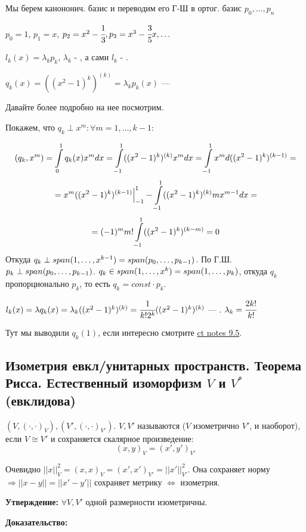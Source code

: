 Мы берем канононич. базис и переводим его Г-Ш в ортог. базис $p_0,\ldots, p_n$

$p_0 = 1$, $p_1 = x$, $p_2 = x^2-\cfrac{1}{3}, p_3 = {x^3}-{\cfrac{3}{5}x}, \ldots$

$l_k(x) = \lambda_k p_k$, $\lambda_k$ - , а сами $l_k$ - .

$q_k(x) = ((x^2-1)^k)^{(k)} = \lambda_k p_k(x)$ --- 

Давайте более подробно на нее посмотрим. 

Покажем, что $q_k \perp x^m: \forall m = 1,\ldots, k-1$:

$$(q_k, x^m) = \displaystyle\int\limits_{0}^{1}q_k(x) x^m dx = \displaystyle\int\limits_{-1}^{1}((x^2-1)^k)^{(k)}x^m dx = \displaystyle\int\limits_{-1}^{1}x^m d ((x^2-1)^k)^{(k-1)} = $$
$$= x^m ((x^2-1)^k)^{(k-1)}\Big|_{-1}^1 - \displaystyle\int\limits_{-1}^{1}((x^2-1)^k)^{(k)}m x^{m-1}dx = $$
$$ = (-1)^m m! \displaystyle\int\limits_{-1}^{1}((x^2-1)^k)^{(k-m)} =0$$
Откуда $q_k \perp span(1,\ldots, x^{k-1}) = span(p_0,\ldots,p_{k-1})$. По Г.Ш. $p_k \perp span (p_0,\ldots, p_{k-1})$. $q_k\in span(1,\ldots, x^k) = span (1,\ldots, p_k)$, откуда $q_k$ пропорционально $p_k$, то есть $q_k = const \cdot p_k$.

$l_k(x) = \lambda q_k(x) = \lambda_k ((x^2-1)^k)^{(k)} = \cfrac{1}{k!2^k}((x^2-1)^k)^{(k)}$ --- .  $\lambda_k = \cfrac{2k!}{k!}$

Тут мы выводили $q_k(1)$, если интересно смотрите \href{https://t.me/c/2402207436/2045/2131}{ct notes 9.5}.

\pagebreak
\subsection{Изометрия евкл/унитарных пространств. Теорема Рисса. Естественный изоморфизм $V$ и $V^*$ (евклидова)}

 $(V, (\cdot,\cdot)_V), (V', (\cdot,\cdot)_{V'})$. $V, V'$ называются  ($V$ изометрично $V'$, и наоборот), если $V \cong V'$ и сохраняется скалярное произведение:
$$(x,y)_V = (x',y')_{V'}$$

Очевидно $||x||^2_V = (x,x)_V =(x',x')_{V'} = ||x'||^2_{V'}$. Она сохраняет норму $\Rightarrow||x-y|| = ||x'-y'||$ сохраняет метрику $\Leftrightarrow$ изометрия.

\textbf{Утверждение:} $\forall V, V'$ одной размерности изометричны.

\textbf{Доказательство:}

